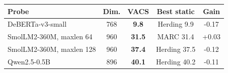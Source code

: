\begin{tabular}{lcccc}
\toprule
Probe & Dim. & VACS & Best static & Gain \\
\midrule
DeBERTa-v3-small & 768 & \textbf{9.8} & Herding 9.9 & -0.17 \\
SmolLM2-360M, maxlen 64 & 960 & \textbf{31.5} & MARC 31.4 & +0.03 \\
SmolLM2-360M, maxlen 128 & 960 & \textbf{37.4} & Herding 37.5 & -0.12 \\
Qwen2.5-0.5B & 896 & \textbf{40.1} & Herding 40.2 & -0.11 \\
\bottomrule
\end{tabular}
